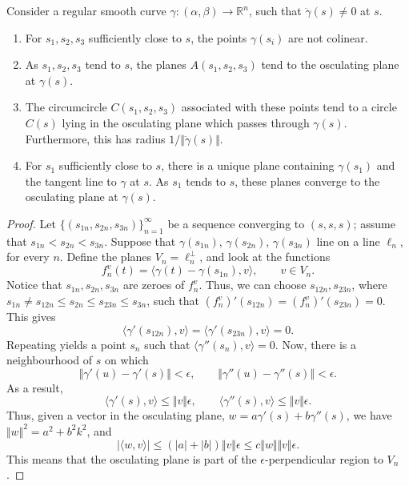 \documentclass[11pt]{article}
\newcommand{\R}{\mathbb{R}}
\newcommand{\ip}[2]{\langle #1, #2 \rangle}
\newcommand{\norm}[1]{\Vert #1 \Vert}
\theoremstyle{definition}
\theoremstyle{remark}
\numberwithin{equation}{section}
\begin{document}
    \begin{theorem}
        Consider a regular smooth curve $\gamma\colon (\alpha, \beta) \to \R^n$, such
        that $\ddot{\gamma}(s) \neq 0$ at $s$. \begin{enumerate}
            \itemsep0em
            \item For $s_1, s_2, s_3$ sufficiently close to $s$, the points
            $\gamma(s_i)$ are not colinear.  
            \item As $s_1, s_2, s_3$ tend to $s$, the planes $A(s_1, s_2, s_3)$ tend
            to the osculating plane at $\gamma(s)$.
            \item The circumcircle $C(s_1, s_2, s_3)$ associated with these points
            tend to a circle $C(s)$ lying in the osculating plane which passes
            through $\gamma(s)$. Furthermore, this has radius $1 /
            \norm{\ddot{\gamma}(s)}$.
            \item For $s_1$ sufficiently close to $s$, there is a unique plane
            containing $\gamma(s_1)$ and the tangent line to $\gamma$ at $s$. As
            $s_1$ tends to $s$, these planes converge to the osculating plane at
            $\gamma(s)$.
        \end{enumerate}
    \end{theorem}
    \begin{proof}
        Let $\{(s_{1n}, s_{2n}, s_{3n})\}_{n = 1}^\infty$ be a sequence converging to
        $(s, s, s)$; assume that $s_{1n} < s_{2n} < s_{3n}$. Suppose that
        $\gamma(s_{1n})$, $\gamma(s_{2n})$, $\gamma(s_{3n})$ line on a line $\ell_n$,
        for every $n$. Define the planes $V_n = \ell_n^\perp$, and look at the
        functions \[
            f_n^v(t) = \ip{\gamma(t) - \gamma(s_{1n})}{v}, \qquad v \in V_n.
        \] Notice that $s_{1n}, s_{2n}, s_{3n}$ are zeroes of $f_n^v$. Thus, we can
        choose $s_{12n}, s_{23n}$, where $s_{1n} \neq s_{12n} \leq s_{2n} \leq
        s_{23n} \leq s_{3n}$, such that $(f_n^v)'(s_{12n}) = (f_n^v)'(s_{23n}) = 0$.
        This gives \[
            \ip{\gamma'(s_{12n})}{v} = \ip{\gamma'(s_{23n})}{v} = 0.
        \] Repeating yields a point $s_{n}$ such that $\ip{\gamma''(s_n)}{v} = 0$.
        Now, there is a neighbourhood of $s$ on which \[
            \norm{\gamma'(u) - \gamma'(s)} < \epsilon, \qquad
            \norm{\gamma''(u) - \gamma''(s)} < \epsilon.
        \] As a result, \[
            \ip{\gamma'(s)}{v} \leq \norm{v}\epsilon, \qquad
            \ip{\gamma''(s)}{v} \leq \norm{v}\epsilon.
        \] Thus, given a vector in the osculating plane, $w = a\gamma'(s) +
        b\gamma''(s)$, we have $\norm{w}^2 = a^2 + b^2k^2$, and \[
            |\ip{w}{v}| \leq (|a| + |b|)\norm{v}\epsilon \leq
            c\norm{w}\norm{v}\epsilon.
        \] This means that the osculating plane is part of the
        $\epsilon$-perpendicular region to $V_n$.
    \end{proof}
\end{document}

